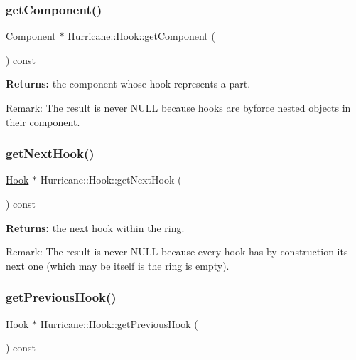 \subsubsection{\texorpdfstring{get\+Component()}{getComponent()}}
{\footnotesize\ttfamily \mbox{\hyperlink{classHurricane_1_1Component}{Component}} $\ast$ Hurricane\+::\+Hook\+::get\+Component (\begin{DoxyParamCaption}{ }\end{DoxyParamCaption}) const\hspace{0.3cm}{\ttfamily [pure virtual]}}

{\bfseries Returns\+:} the component whose hook represents a part.

\begin{DoxyParagraph}{Remark\+: The result is never N\+U\+LL because hooks are byforce nested }
objects in their component. 
\end{DoxyParagraph}
\mbox{\label{classHurricane_1_1Hook_a03044fa995d6d784d6c441927ca8af04}} 
\subsubsection{\texorpdfstring{get\+Next\+Hook()}{getNextHook()}}
{\footnotesize\ttfamily \mbox{\hyperlink{classHurricane_1_1Hook}{Hook}} $\ast$ Hurricane\+::\+Hook\+::get\+Next\+Hook (\begin{DoxyParamCaption}{ }\end{DoxyParamCaption}) const}

{\bfseries Returns\+:} the next hook within the ring.

\begin{DoxyParagraph}{Remark\+: The result is never N\+U\+LL because every hook has by }
construction its next one (which may be itself is the ring is empty). 
\end{DoxyParagraph}
\mbox{\label{classHurricane_1_1Hook_ad69ebbbf3d64343aca23ca435f24c624}} 
\subsubsection{\texorpdfstring{get\+Previous\+Hook()}{getPreviousHook()}}
{\footnotesize\ttfamily \mbox{\hyperlink{classHurricane_1_1Hook}{Hook}} $\ast$ Hurricane\+::\+Hook\+::get\+Previous\+Hook (\begin{DoxyParamCaption}{ }\end{DoxyParamCaption}) const}

